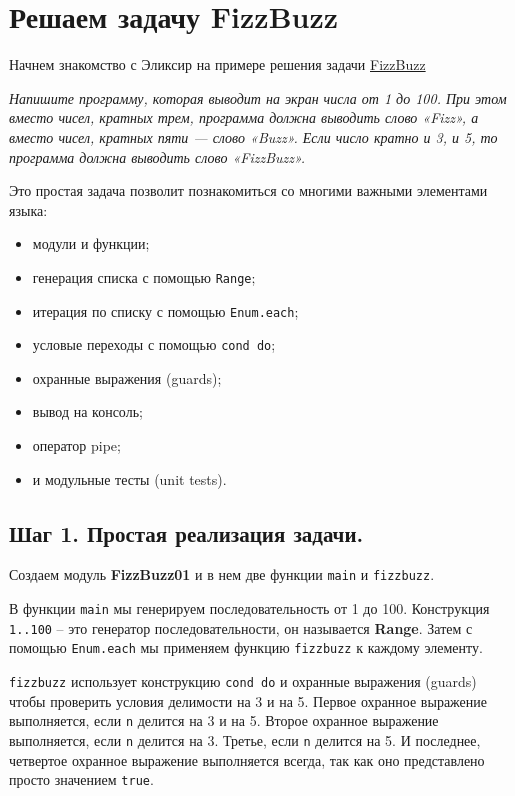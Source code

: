 \chapter{Решаем задачу FizzBuzz}

Начнем знакомство с Эликсир на примере решения задачи \href{https://ru.wikipedia.org/wiki/Fizz_buzz}{FizzBuzz}

\textit{Напишите программу, которая выводит на экран числа от 1 до 100. При этом вместо чисел, кратных трем, программа должна выводить слово «Fizz», а вместо чисел, кратных пяти — слово «Buzz». Если число кратно и 3, и 5, то программа должна выводить слово «FizzBuzz».}

Это простая задача позволит познакомиться со многими важными элементами языка:
\begin{itemize}
\item модули и функции;
\item генерация списка с помощью \texttt{Range};
\item итерация по списку с помощью \texttt{Enum.each};
\item условые переходы с помощью \texttt{cond do};
\item охранные выражения (guards);
\item вывод на консоль;
\item оператор pipe;
\item и модульные тесты (unit tests).
\end{itemize}

\section{Шаг 1. Простая реализация задачи.}

Создаем модуль \textbf{FizzBuzz01} и в нем две функции \texttt{main} и \texttt{fizzbuzz}.



В функции \texttt{main} мы генерируем последовательность от 1 до 100. Конструкция \texttt{1..100} -- это генератор последовательности, он называется \textbf{Range}. Затем с помощью \texttt{Enum.each} мы применяем функцию \texttt{fizzbuzz} к каждому элементу.

\texttt{fizzbuzz} использует конструкцию \texttt{cond do} и охранные выражения (guards) чтобы проверить условия делимости на 3 и на 5. Первое охранное выражение выполняется, если \texttt{n} делится на 3 и на 5. Второе охранное выражение выполняется, если \texttt{n} делится на 3. Третье, если \texttt{n} делится на 5. И последнее, четвертое охранное выражение выполняется всегда, так как оно представлено просто значением \texttt{true}.

